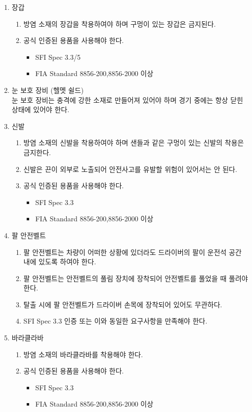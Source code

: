 \documentclass[final,a4paper,10pt]{report}
\begin{document}
\begin{enumerate}
  \item 장갑
    \begin{enumerate}
      \item 방염 소재의 장갑을 착용하여야 하며 구멍이 있는 장갑은 금지된다.
      
      \item 공식 인증된 용품을 사용해야 한다.
        \begin{itemize}
          \item SFI Spec 3.3/5
          \item FIA Standard 8856-200,8856-2000 이상
        \end{itemize}
    \end{enumerate}
    
  \item 눈 보호 장비 (헬멧 쉴드)\\
    눈 보호 장비는 충격에 강한 소재로 만들어져 있어야 하며 경기 중에는 항상 닫힌 상태에 있어야 한다.
    
  \item 신발
    \begin{enumerate}
      \item 방염 소재의 신발을 착용하여야 하며 샌들과 같은 구멍이 있는 신발의 착용은 금지한다.
      \item 신발은 끈이 외부로 노출되어 안전사고를 유발할 위험이 있어서는 안 된다.
      \item 공식 인증된 용품을 사용해야 한다.
        \begin{itemize}
          \item SFI Spec 3.3
          \item FIA Standard 8856-200,8856-2000 이상
        \end{itemize}
    \end{enumerate}
    
  \item 팔 안전벨트
    \begin{enumerate}
      \item 팔 안전벨트는 차량이 어떠한 상황에 있더라도 드라이버의 팔이 운전석 공간 내에 있도록 하여야 한다.
      \item 팔 안전벨트는 안전벨트의 풀림 장치에 장착되어 안전벨트를 풀었을 때 풀려야 한다.
      \item 탈출 시에 팔 안전벨트가 드라이버 손목에 장착되어 있어도 무관하다.
      \item SFI Spec 3.3 인증 또는 이와 동일한 요구사항을 만족해야 한다.
    \end{enumerate}
  \item 바라클라바
    \begin{enumerate}
      \item 방염 소재의 바라클라바를 착용해야 한다.
      
      \item 공식 인증된 용품을 사용해야 한다.
        \begin{itemize}
          \item SFI Spec 3.3
          \item FIA Standard 8856-200,8856-2000 이상
        \end{itemize}
    \end{enumerate}
\end{enumerate}
\end{document}
